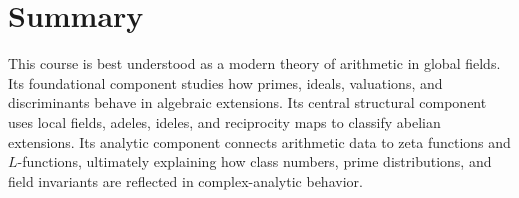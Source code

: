 \documentclass[11pt]{article}
\begin{document}
\section{Summary}

This course is best understood as a modern theory of arithmetic in global fields. Its foundational component studies how primes, ideals, valuations, and discriminants behave in algebraic extensions. Its central structural component uses local fields, adeles, ideles, and reciprocity maps to classify abelian extensions. Its analytic component connects arithmetic data to zeta functions and $L$-functions, ultimately explaining how class numbers, prime distributions, and field invariants are reflected in complex-analytic behavior.
\end{document}
